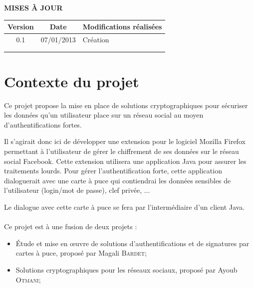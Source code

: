 \documentclass[a4paper,11pt,french]{article}
\begin{document}
\makeFirstPage
\clearpage

\vspace*{1cm}
\begin{center}
\textbf{\huge{MISES À JOUR}}\\
\vspace*{3cm}
	\begin{tabularx}{16cm}{|c|c|X|}
	\hline
	\bfseries{Version} & \bfseries{Date} & \bfseries{Modifications réalisées}\\
	\hline
	0.1 & 07/01/2013 & Création\\
	\hline
	&&\\
	\hline
	&&\\
	\hline
	\end{tabularx}
\end{center}

\clearpage
\tableofcontents
\clearpage

\section{Contexte du projet}
Ce projet propose la mise en place de solutions cryptographiques pour sécuriser
les données qu'un utilisateur place sur un réseau social au moyen  
d'authentifications fortes.

Il s'agirait donc ici de développer une extension pour le logiciel
Mozilla Firefox permettant à l'utilisateur de gérer le chiffrement de 
ses données sur le réseau social Facebook. Cette extension utilisera une 
application Java pour assurer les traitements lourds. Pour gérer 
l'authentification forte, cette application dialoguerait avec une carte à 
puce qui contiendrai les données sensibles de l'utilisateur 
(login/mot de passe), clef privée, ...

Le dialogue avec cette carte à puce se fera par l'intermédiaire d'un
client Java.

\paragraph{}
Ce projet est à une fusion de deux projets :
\begin{itemize}
    \item Étude et mise en \oe{}uvre de solutions d'authentifications 
    et de signatures par cartes à puce, proposé par Magali \textsc{Bardet};
    \item Solutions cryptographiques pour les réseaux sociaux, 
    proposé par Ayoub \textsc{Otmani};
\end{itemize}
\end{document}
